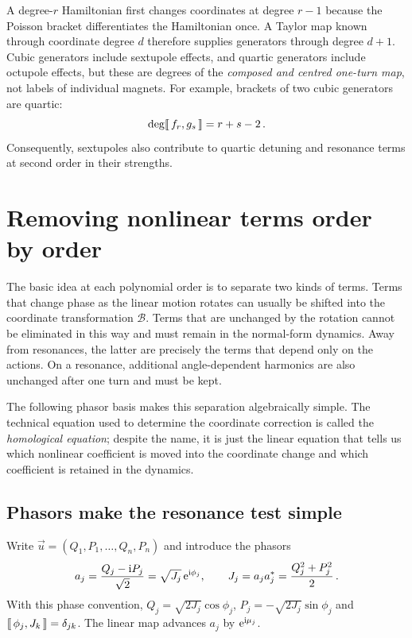A degree-$r$ Hamiltonian first changes coordinates at degree $r-1$ because
the Poisson bracket differentiates the Hamiltonian once.  A Taylor map
known through coordinate degree $d$ therefore supplies generators through
degree $d + 1$.  Cubic generators include sextupole effects, and quartic
generators include octupole effects, but these are degrees of the
\emph{composed and centred one-turn map}, not labels of individual magnets.
For example, brackets of two cubic generators are quartic:
\begin{equation}
    \deg\llbracket \, f_r,g_s\,\rrbracket = r + s-2\,.
\end{equation}
Consequently, sextupoles also contribute to quartic detuning and resonance
terms at second order in their strengths.



\section{Removing nonlinear terms order by order}\label{sec:nnf-order-by-order}

The basic idea at each polynomial order is to separate two kinds of terms.
Terms that change phase as the linear motion rotates can usually be shifted
into the coordinate transformation $\mathcal B$.  Terms that are unchanged by
the rotation cannot be eliminated in this way and must remain in the
normal-form dynamics.  Away from resonances, the latter are precisely the
terms that depend only on the actions.  On a resonance, additional
angle-dependent harmonics are also unchanged after one turn and must be kept.

The following phasor basis makes this separation algebraically simple.  The
technical equation used to determine the coordinate correction is called the
\emph{homological equation}; despite the name, it is just the linear equation
that tells us which nonlinear coefficient is moved into the coordinate change
and which coefficient is retained in the dynamics.


\subsection{Phasors make the resonance test simple}

Write $\vec u = (Q_1,P_1,\ldots,Q_n,P_n)$ and introduce the phasors
\begin{equation}\label{eq:nnf-phasors}
    a_j = \frac{Q_j-\mathrm{i} P_j}{\sqrt 2} = \sqrt{J_j}\,\mathrm{e}^{\mathrm{i}\phi_j},\qquad
    J_j = a_ja_j^* = \frac{Q_j^2 + P_j^2}{2}\,.
\end{equation}
With this phase convention,
$Q_j = \sqrt{2J_j}\cos\phi_j$,
$P_j = -\sqrt{2J_j}\sin\phi_j$ and $\llbracket \, \phi_j,J_k\,\rrbracket = \delta_{jk}$.
The linear map advances $a_j$ by $\mathrm{e}^{\mathrm{i}\mu_j}$.

